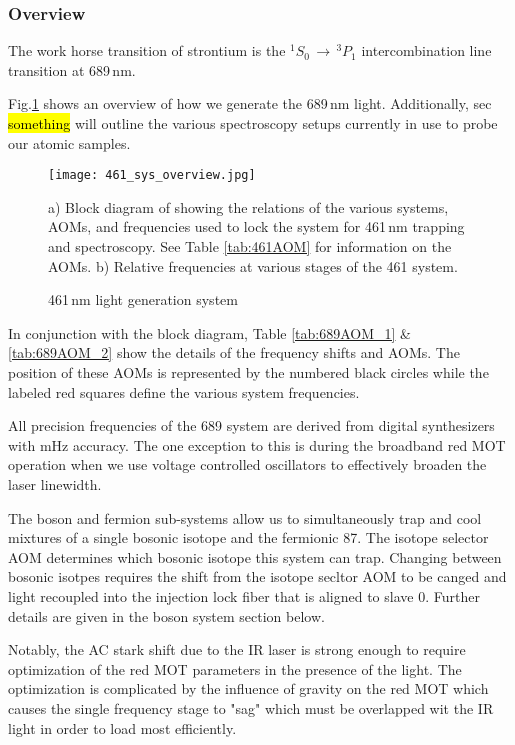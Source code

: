 \subsubsection{Overview}
The work horse transition of strontium is the $^1S_0\,\rightarrow\,^3P_1$ intercombination line transition at 689\,nm. 

Fig.\ref{fig:689blockSys} shows an overview of how we generate the 689\,nm light. 
Additionally, sec \hl{something} will outline the various spectroscopy setups currently in use to probe our atomic samples.
	\begin{figure}
		\centerline{
		\texttt{[image: 461\_sys\_overview.jpg]}}
		\caption{461\,nm light generation system}{a) Block diagram of showing the relations of the various systems, AOMs, and frequencies used to lock the system for 461\,nm trapping and spectroscopy. See Table \ref{tab:461AOM} for information on the AOMs. b) Relative frequencies at various stages of the 461 system.}
		\label{fig:689blockSys}
	\end{figure} 

In conjunction with the block diagram, Table \ref{tab:689AOM_1} \& \ref{tab:689AOM_2} show the details of the frequency shifts and AOMs. 
The position of these AOMs is represented by the numbered black circles while the labeled red squares define the various system frequencies.

All precision frequencies of the 689 system are derived from digital synthesizers with mHz accuracy.
The one exception to this is during the broadband red MOT operation when we use voltage controlled oscillators to effectively broaden the laser linewidth.

The boson and fermion sub-systems allow us to simultaneously trap and cool mixtures of a single bosonic isotope and the fermionic 87.
The isotope selector AOM determines which bosonic isotope this system can trap.
Changing between bosonic isotpes requires the shift from the isotope secltor AOM to be canged and light recoupled into the injection lock fiber that is aligned to slave 0.
Further details are given in the boson system section below.

Notably, the AC stark shift due to the IR laser is strong enough to require optimization of the red MOT parameters in the presence of the light.
The optimization is complicated by the influence of gravity on the red MOT which causes the single frequency stage to "sag" which must be overlapped wit the IR light in order to load most efficiently.
	
